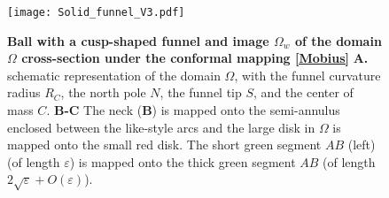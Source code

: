 \documentclass[12pt]{article}
\newcommand{\eps}{\varepsilon}
\begin{document}
\begin{figure}[H]
	\center
	\texttt{[image: Solid\_funnel\_V3.pdf]}
	\caption{ {\small  {\bf Ball with a cusp-shaped funnel and image $\Omega_w$ of the domain $\Omega$ cross-section under the conformal mapping \eqref{Mobius}}
	{\bf A.} schematic representation of the domain $\Omega$, with the funnel curvature radius $R_C$, the north pole $N$, the funnel tip $S$, and the center of mass $C$.
	{\bf B-C} The neck ({\bf B}) is mapped onto the
	semi-annulus enclosed between the like-style arcs and the large disk in $\Omega$ is mapped
	onto the small red disk. The short green segment $AB$ (left) (of length $\eps$) is
	mapped onto the thick green segment $AB$ (of length $2\sqrt{\eps}+O(\eps)$).} \label{f:conf}}
\end{figure}
\end{document}

